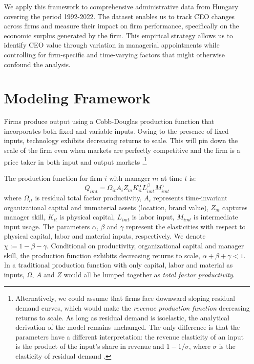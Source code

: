 \documentclass[11pt,a4paper]{article}
\begin{document}
We apply this framework to comprehensive administrative data from Hungary covering the period 1992-2022. The dataset enables us to track CEO changes across firms and measure their impact on firm performance, specifically on the economic surplus generated by the firm. This empirical strategy allows us to identify CEO value through variation in managerial appointments while controlling for firm-specific and time-varying factors that might otherwise confound the analysis.


\section{Modeling Framework}
Firms produce output using a Cobb-Douglas production function that incorporates both fixed and variable inputs. Owing to the presence of fixed inputs, technology exhibits decreasing returns to scale. This will pin down the scale of the firm even when markets are perfectly competitive and the firm is a price taker in both input and output markets \citep{AtkesonKehoe2005JPE,McGrattan2012RED}.\footnote{Alternatively, we could assume that firms face downward sloping residual demand curves, which would make the \emph{revenue production function} decreasing returns to scale. As long as residual demand is isoelastic, the analytical derivation of the model remains unchanged. The only difference is that the parameters have a different interpretation: the revenue elasticity of an input is the product of the input's share in revenue and $1-1/\sigma$, where $\sigma$ is the elasticity of residual demand \citep{DeLoecker2011Econometrica}.}

The production function for firm $i$ with manager $m$ at time $t$ is:
\begin{equation}
Q_{imt} = \Omega_{it}A_i Z_{m}  K_{it}^\alpha L_{imt}^{\beta} M_{imt}^{\gamma}
\end{equation}
where $\Omega_{it}$ is residual total factor productivity, $A_i$ represents time-invariant organizational capital and immaterial assets (location, brand value), $Z_m$ captures manager skill, $K_{it}$ is physical capital, $L_{imt}$ is labor input, $M_{imt}$ is intermediate input usage. The parameters $\alpha$, $\beta$ and $\gamma$ represent the elasticities with respect to physical capital, labor and material inputs, respectively. We denote $\chi := 1 - \beta - \gamma$. Conditional on productivity, organizational capital and manager skill, the production function exhibits decreasing returns to scale, $\alpha + \beta + \gamma < 1$. In a traditional production function with only capital, labor and material as inputs, $\Omega$, $A$ and $Z$ would all be lumped together as \emph{total factor productivity}.
\end{document}
